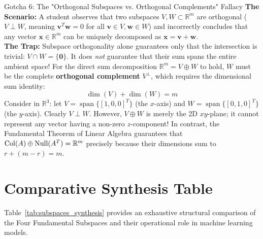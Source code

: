 \begin{trapbox}{Gotcha 6: The "Orthogonal Subspaces vs. Orthogonal Complements" Fallacy}
\textbf{The Scenario:} A student observes that two subspaces $V, W \subset \mathbb{R}^m$ are orthogonal ($V \perp W$, meaning $\mathbf{v}^T \mathbf{w} = 0$ for all $\mathbf{v} \in V, \mathbf{w} \in W$) and incorrectly concludes that any vector $\mathbf{x} \in \mathbb{R}^m$ can be uniquely decomposed as $\mathbf{x} = \mathbf{v} + \mathbf{w}$. \\
\textbf{The Trap:} Subspace orthogonality alone guarantees only that the intersection is trivial: $V \cap W = \{\mathbf{0}\}$. It does \emph{not} guarantee that their sum spans the entire ambient space! For the direct sum decomposition $\mathbb{R}^m = V \oplus W$ to hold, $W$ must be the complete \textbf{orthogonal complement} $V^\perp$, which requires the dimensional sum identity:
\begin{equation*}
\dim(V) + \dim(W) = m
\end{equation*}
Consider in $\mathbb{R}^3$: let $V = \operatorname{span}\{[1, 0, 0]^T\}$ (the $x$-axis) and $W = \operatorname{span}\{[0, 1, 0]^T\}$ (the $y$-axis). Clearly $V \perp W$. However, $V \oplus W$ is merely the 2D $xy$-plane; it cannot represent any vector having a non-zero $z$-component! In contrast, the Fundamental Theorem of Linear Algebra guarantees that $\operatorname{Col}(A) \oplus \operatorname{Null}(A^T) = \mathbb{R}^m$ precisely because their dimensions sum to $r + (m - r) = m$.
\end{trapbox}

\section{Comparative Synthesis Table}

Table~\ref{tab:subspaces_synthesis} provides an exhaustive structural comparison of the Four Fundamental Subspaces and their operational role in machine learning models.

